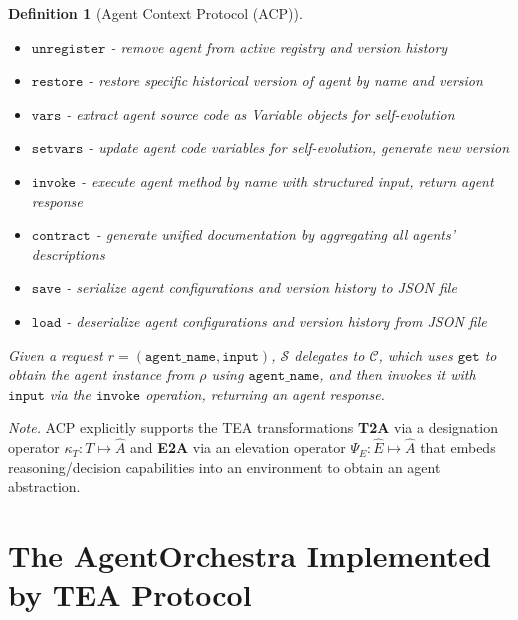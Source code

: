 \documentclass[11pt]{article}
\newtheorem{definition}{Definition}
\begin{document}
\begin{definition}[Agent Context Protocol (ACP)]
\begin{itemize}[leftmargin=*,itemsep=0.1em]
\begin{itemize}[leftmargin=*,itemsep=0.05em]
    \item $\mathtt{unregister}$ - remove agent from active registry and version history
    \item $\mathtt{restore}$ - restore specific historical version of agent by name and version
    \item $\mathtt{vars}$ - extract agent source code as Variable objects for self-evolution
    \item $\mathtt{setvars}$ - update agent code variables for self-evolution, generate new version
    \item $\mathtt{invoke}$ - execute agent method by name with structured input, return agent response
    \item $\mathtt{contract}$ - generate unified documentation by aggregating all agents' descriptions
    \item $\mathtt{save}$ - serialize agent configurations and version history to JSON file
    \item $\mathtt{load}$ - deserialize agent configurations and version history from JSON file
  \end{itemize}
\end{itemize}
Given a request $r = (\mathtt{agent\_name}, \mathtt{input})$, $\mathcal{S}$ delegates to $\mathcal{C}$, which uses $\mathtt{get}$ to obtain the agent instance from $\rho$ using $\mathtt{agent\_name}$, and then invokes it with $\mathtt{input}$ via the $\mathtt{invoke}$ operation, returning an agent response.
\end{definition}

\noindent\textit{Note.} ACP explicitly supports the TEA transformations \textbf{T2A} via a designation operator $\kappa_T: T\mapsto \widehat{A}$ and \textbf{E2A} via an elevation operator $\Psi_E: \widehat{E}\mapsto \widehat{A}$ that embeds reasoning/decision capabilities into an environment to obtain an agent abstraction.

\section{The AgentOrchestra Implemented by TEA Protocol}
\label{app_sec:the_agentorchestra_framework_based_on_tea_protocol}
\end{document}
